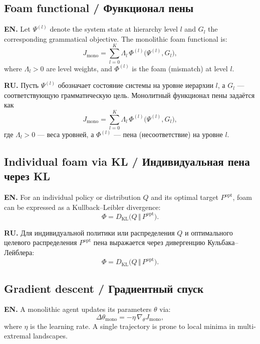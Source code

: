 \documentclass[11pt,a4paper]{article}
\begin{document}
\subsection{Foam functional / Функционал пены}

\textbf{EN.}
Let $\Psi^{(l)}$ denote the system state at hierarchy level $l$ and $G_l$ the corresponding grammatical objective.
The monolithic foam functional is:
\begin{equation}
J_{\text{mono}} = \sum_{l=0}^{K} \Lambda_l \,\Phi^{(l)}\bigl(\Psi^{(l)}, G_l\bigr),
\label{eq:Jmono}
\end{equation}
where $\Lambda_l > 0$ are level weights, and $\Phi^{(l)}$ is the foam (mismatch) at level $l$.

\textbf{RU.}
Пусть $\Psi^{(l)}$ обозначает состояние системы на уровне иерархии $l$, а $G_l$ --- соответствующую грамматическую цель.
Монолитный функционал пены задаётся как
\begin{equation}
J_{\text{mono}} = \sum_{l=0}^{K} \Lambda_l \,\Phi^{(l)}\bigl(\Psi^{(l)}, G_l\bigr),
\end{equation}
где $\Lambda_l > 0$ --- веса уровней, а $\Phi^{(l)}$ --- пена (несоответствие) на уровне $l$.

\subsection{Individual foam via KL / Индивидуальная пена через KL}

\textbf{EN.}
For an individual policy or distribution $Q$ and its optimal target $P^{\text{opt}}$, foam can be expressed as a Kullback--Leibler divergence:
\begin{equation}
\Phi = D_{\text{KL}}\bigl(Q \,\Vert\, P^{\text{opt}}\bigr).
\label{eq:phiKL}
\end{equation}

\textbf{RU.}
Для индивидуальной политики или распределения $Q$ и оптимального целевого распределения $P^{\text{opt}}$ пена выражается через дивергенцию Кульбака--Лейблера:
\begin{equation}
\Phi = D_{\text{KL}}\bigl(Q \,\Vert\, P^{\text{opt}}\bigr).
\end{equation}

\subsection{Gradient descent / Градиентный спуск}

\textbf{EN.}
A monolithic agent updates its parameters $\theta$ via:
\begin{equation}
\Delta \theta_{\text{mono}} = -\eta \,\nabla_{\theta} J_{\text{mono}},
\label{eq:mono_update}
\end{equation}
where $\eta$ is the learning rate.
A single trajectory is prone to local minima in multi-extremal landscapes.
\end{document}

